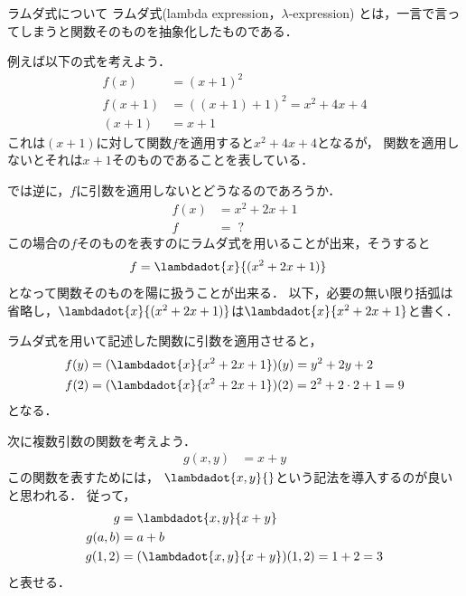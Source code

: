 \documentclass[a4paper,titlepage,report,disablejfam]{jsbook}
\begin{document}
\begin{resbonsiblesection}{ラムダ式について}{\sakamoto}\label{sc:about-lambda-expression}
ラムダ式(lambda expression，$\lambda$-expression) とは，一言で言ってしまうと関数そのものを抽象化したものである．

例えば以下の式を考えよう．
\begin{align}
f(x) &= (x + 1)^2\\
f(x + 1) &= {\left((x + 1) + 1\right)}^2 = x^2 + 4x + 4\\
(x + 1) &= x + 1
\end{align}
これは$(x + 1)$に対して関数$f$を適用すると$x^2 + 4x + 4$となるが，
関数を適用しないとそれは$x + 1$そのものであることを表している．

では逆に，$f$に引数を適用しないとどうなるのであろうか．
\begin{align}
f(x) &= x^2 + 2x + 1\\
f    &= \;?
\end{align}
この場合の$f$そのものを表すのにラムダ式を用いることが出来，そうすると
\begin{align}
f &= \lambdadot{x}{(x^2 + 2x + 1)}
\end{align}
となって関数そのものを陽に扱うことが出来る．
以下，必要の無い限り括弧は省略し，$\lambdadot{x}{(x^2 + 2x + 1)}$は$\lambdadot{x}{x^2 + 2x + 1}$と書く．

ラムダ式を用いて記述した関数に引数を適用させると，
\begin{align}
f(y) &= (\lambdadot{x}{x^2 + 2x + 1})(y) = y^2 + 2y + 2 \\
f(2) &= (\lambdadot{x}{x^2 + 2x + 1})(2) = 2^2 + 2\cdot 2 + 1 = 9
\end{align}
となる．

次に複数引数の関数を考えよう．
\begin{align}
g(x, y) &= x + y
\end{align}
この関数を表すためには，
$\lambdadot{x,y}{}$という記法を導入するのが良いと思われる．
従って，
\begin{align}
\label{eq:lambda-multiple}
g &= \lambdadot{x,y}{x + y}\\
\label{eq:lambda-multiple-inst}
g(a, b) &= a + b\\
g(1, 2) &= (\lambdadot{x,y}{x + y})(1, 2) = 1 + 2 = 3
\end{align}
と表せる．


\end{resbonsiblesection}
\end{document}
